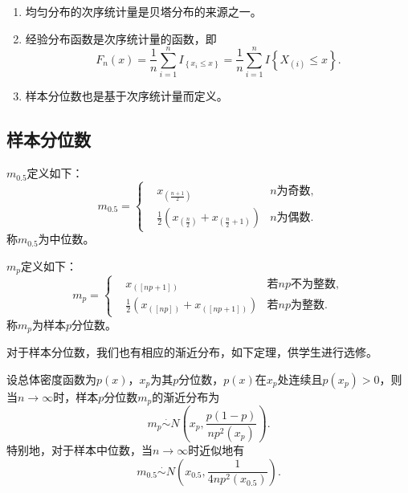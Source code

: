\begin{remark}
    \begin{enumerate}
       \item 均匀分布的次序统计量是贝塔分布的来源之一。
        \item 经验分布函数是次序统计量的函数，即
         $$F_{n}(x)=\frac{1}{n} \sum_{i=1}^{n} I_{\left\{x_{i} \leq x\right\}}=\frac{1}{n} \sum_{i=1}^{n} I\left\{X_{(i)} \leq x\right\}.$$
         \item 样本分位数也是基于次序统计量而定义。
    \end{enumerate}
\end{remark}

\subsection{样本分位数}
\begin{definition}
    $m_{0.5}$定义如下：
    $$
    m_{0.5} = \left\{\begin{aligned}
        & x_{\left(\frac{n+1}{2}\right)} & n\text{为奇数}, \\
&\frac{1}{2}\left(x_{\left(\frac{n}{2}\right)}+x_{\left(\frac{n}{2}+1\right)}\right) & n\text{为偶数}.
    \end{aligned}
    \right.
    $$
    称$m_{0.5}$为中位数。
\end{definition}

\begin{definition}
    $m_{p}$定义如下：
    $$
    m_{p} = \left\{\begin{aligned}
        & x_{\left([np+1]\right)} & \text{若$np$不为整数}, \\
&\frac{1}{2}\left(x_{\left([np]\right)}+x_{\left( [np+1]\right)}\right) & \text{若$np$为整数}.
    \end{aligned}
    \right.
    $$
    称$m_{p}$为样本$p$分位数。
\end{definition}

对于样本分位数，我们也有相应的渐近分布，如下定理，供学生进行选修。
\begin{theorem}
    设总体密度函数为$p(x)$，$x_p$为其$p$分位数，$p(x)$在$x_p$处连续且$p(x_p)>0$，则当$n\rightarrow \infty$时，样本$p$分位数$m_p$的渐近分布为
    $$
    m_p \overset{\cdot}{\sim } N\left(x_p, \frac{p(1-p)}{np^2(x_p)}\right).
    $$
    特别地，对于样本中位数，当$n\rightarrow \infty$时近似地有
    $$
    m_{0.5} \overset{\cdot}{\sim } N\left(x_{0.5}, \frac{1}{4np^2(x_{0.5})}\right).
    $$
\end{theorem}






